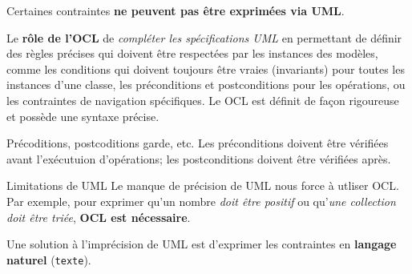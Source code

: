 \documentclass[16pt]{report}
\begin{document}
\begin{multicols*}{2}
        \begin{note}{}{}
            Certaines contraintes \textbf{ne peuvent pas être exprimées via UML}.
        \end{note}

        \begin{Concept}{}{}
            Le \textbf{rôle de l'OCL} de \textit{compléter les spécifications UML} en permettant de définir des règles 
            précises qui doivent être respectées par les instances des modèles, comme les conditions qui doivent
            toujours être vraies (\textcolor{myb}{invariants}) pour toutes les instances d'une classe, 
            les \textcolor{myb}{préconditions} et 
            \textcolor{myb}{postconditions} pour les opérations, ou les contraintes de navigation spécifiques. Le OCL 
            est définit de façon rigoureuse et possède une syntaxe précise.
        \end{Concept}


        \begin{Syntaxe}{Précoditions, postcoditions garde, etc.}{}
            Les \textcolor{myb}{préconditions} doivent être vérifiées avant l'exécutuion d'opérations; 
            les postconditions doivent être vérifiées après. 
        \end{Syntaxe}


        \begin{EExample}{Limitations de UML}{}
            Le manque de précision de UML nous force à utliser OCL. Par exemple, pour exprimer qu'un nombre 
            \textit{doit être positif} ou qu'\textit{une collection doit être triée}, \textbf{OCL est nécessaire}.
        \end{EExample}

        Une solution à l'imprécision de UML est d'exprimer les contraintes en \textbf{langage naturel} 
        (\texttt{texte}).   


\end{multicols*}
\end{document}
